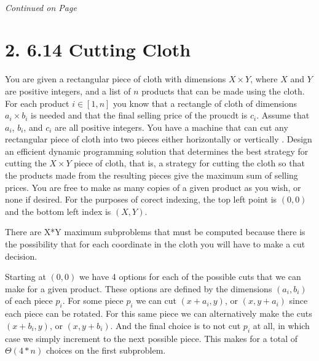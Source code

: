\documentclass[11pt]{article}
\begin{document}
\label{pg:end-of-p1}
%
 \paragraph{} \emph{Continued on Page \pageref{pg:p1-continuation}}

\newpage

\pagestyle{plain}

\section*{2. 6.14 Cutting Cloth}

You are given a rectangular piece of cloth with dimensions $X\times Y$, where $X$ and $Y$ are positive integers, and a list of $n$ products that can be made using the cloth. 
For each product $i \in [1,n]$ you know that a rectangle of cloth of dimensions $a_i \times b_i$ is needed and that the final selling price of the proucdt is $c_i$. Assume that $a_i$, $b_i$, and $c_i$ are all positive integers.
You have a machine that can cut any rectangular piece of cloth into two pieces either horizontally or vertically .
Design an efficient dynamic programming solution that determines the best strategy for cutting the $X\times Y$ piece of cloth, that is, a strategy for cutting the cloth so that the products made from the resulting pieces give the maximum sum of selling prices.
You are free to make as many copies of a given product as you wish, or none if desired. 
For the purposes of corect indexing, the top left point is $(0,0)$ and the bottom left index is $(X,Y)$. 

There are X*Y maximum subproblems that must be computed because there is the possibility that for each coordinate in the cloth
you will have to make a cut decision.

Starting at $(0,0)$ we have 4 options for each of the possible cuts that we can make for a given product. These options are defined by the
dimensions $(a_i,b_i)$ of each piece $p_i$. For some piece $p_i$ we can cut $(x+a_i,y)$, or $(x,y+a_i)$ since each piece can
be rotated. For this same piece we can alternatively make the cuts $(x+b_i,y)$, or   $(x,y+b_i)$. And the final choice is to
not cut $p_i$ at all, in which case we simply increment to the next possible piece. This makes for a total of $\Theta(4*n)$ choices
on the first subproblem.
\end{document}
